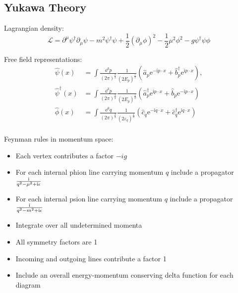 	\subsection{Yukawa Theory}
		Lagrangian density:
		\begin{equation}
			\mathcal{L}=\partial^{\mu}\psi^{\dagger}\partial_{\mu}\psi-m^{2}\psi^{\dagger}\psi+\frac{1}{2}(\partial_{\mu}\phi)^{2}-\frac{1}{2}\mu^{2}\phi^{2}-g\psi^{\dagger}\psi\phi
		\end{equation}

		\noindent
		Free field representations:
		\begin{equation}
			\begin{aligned}
				\hat{\psi}(x) &= \int\frac{\dd^{3}p}{\left(2\pi\right)^{\frac{3}{2}}}\frac{1}{(2E_{p})^{\frac{1}{2}}}\left(\hat{a}_{p}\mathrm{e}^{-\mathrm{i}p\cdot x}+\hat{b}_{p}^{\dagger}\mathrm{e}^{\mathrm{i}p\cdot x}\right), \\
				\hat{\psi}^{\dagger}(x) &= \int\frac{\dd^{3}p}{(2\pi)^{\frac{3}{2}}}\frac{1}{(2E_{p})^{\frac{1}{2}}}\left(\hat{a}_{p}^{\dagger}\mathrm{e}^{\mathrm{i}p\cdot x}+\hat{b}_{p}\mathrm{e}^{-\mathrm{i}p\cdot x}\right) \\
				\hat{\phi}(x) &=\int\frac{\dd^{3}q}{\left(2\pi\right)^{\frac{3}{2}}}\frac{1}{\left(2\varepsilon_{q}\right)^{\frac{1}{2}}}\left(\hat{c}_{q}\mathrm{e}^{-\mathrm{i}q\cdot x}+\hat{c}_{q}^{\dagger}\mathrm{e}^{\mathrm{i}q\cdot x}\right) \\
			\end{aligned}
		\end{equation}

		\noindent
		Feynman rules in momentum space:
		\begin{itemize}\itemsep -0pt
			\item Each vertex contributes a factor $-ig$
			\item For each internal phion line carrying momentum $q$ include a propagator $\frac{\mathrm{i}}{q^2 -\mu^2+\mathrm{i}\epsilon}$
			\item For each internal psion line carrying momentum $q$ include a
			propagator $\frac{\mathrm{i}}{q^2 -m^2+\mathrm{i}\epsilon}$
			\item Integrate over all undetermined momenta
			\item All symmetry factors are 1
			\item Incoming and outgoing lines contribute a factor 1
			\item Include an overall energy-momentum conserving delta function
			for each diagram
		\end{itemize}
		

